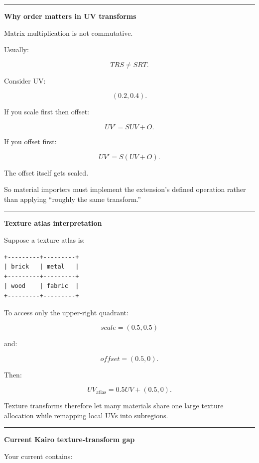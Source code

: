 \begin{center}\rule{0.5\linewidth}{0.5pt}\end{center}

\textbf{Why order matters in UV transforms}

Matrix multiplication is not commutative.

Usually:

\[
TRS
\neq
SRT.
\]

Consider UV:

\[
(0.2,0.4).
\]

If you scale first then offset:

\[
UV'=S UV+O.
\]

If you offset first:

\[
UV'=S(UV+O).
\]

The offset itself gets scaled.

So material importers must implement the extension's defined operation rather than applying ``roughly the same transform.''

\begin{center}\rule{0.5\linewidth}{0.5pt}\end{center}

\textbf{Texture atlas interpretation}

Suppose a texture atlas is:

\begin{verbatim}
+---------+---------+
| brick   | metal   |
+---------+---------+
| wood    | fabric  |
+---------+---------+
\end{verbatim}

To access only the upper-right quadrant:

\[
scale=(0.5,0.5)
\]

and:

\[
offset=(0.5,0).
\]

Then:

\[
UV_{\text{atlas}}
=
0.5UV+
(0.5,0).
\]

Texture transforms therefore let many materials share one large texture allocation while remapping local UVs into subregions.

\begin{center}\rule{0.5\linewidth}{0.5pt}\end{center}

\textbf{Current Kairo texture-transform gap}

Your current  contains:

